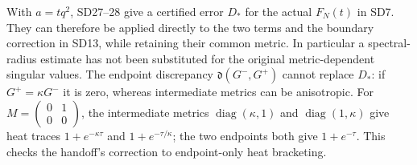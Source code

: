 With $a=tq^2$, SD27--28 give a certified error $D_*$ for the actual
$F_N(t)$ in SD7. They can therefore be applied directly to the two
terms and the boundary correction in SD13, while retaining their
common metric. In particular a spectral-radius estimate has not been
substituted for the original metric-dependent singular values.
The endpoint discrepancy $\mathfrak d(G^-,G^+)$ cannot replace $D_*$:
if $G^+=\kappa G^-$ it is zero, whereas intermediate metrics can be
anisotropic. For $M=\left(\begin{smallmatrix}0&1\\0&0\end{smallmatrix}\right)$,
the intermediate metrics $\operatorname{diag}(\kappa,1)$ and
$\operatorname{diag}(1,\kappa)$ give heat traces $1+e^{-\kappa\tau}$
and $1+e^{-\tau/\kappa}$; the two endpoints both give $1+e^{-\tau}$.
This checks the handoff's correction to endpoint-only heat bracketing.


